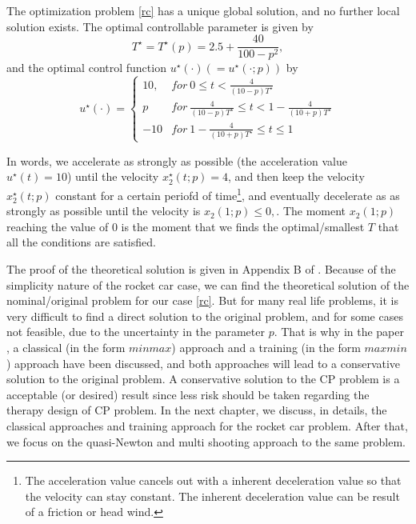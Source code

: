 The optimization problem \ref{rc} has a unique global solution, and no further local solution exists. The optimal controllable parameter is given by 
\begin{equation}
	T^\star = T^\star(p) = 2.5 + \frac{40}{100-p^2},
\end{equation}
and the optimal control function $u^\star(\cdot) (= u^\star(\cdot; p))$ by 
\begin{equation}
	u^\star(\cdot) =     \left\{
	\begin{array}{ll}
		10, & for \  0 \leq t <  \frac{4}{(10-p)T^\star}\\
		p  &  for \ \frac{4}{(10-p)T^\star} \leq t < 1- \frac{4}{(10+p)T^\star} \\
		-10  & for \  1- \frac{4}{(10+p)T^\star} \leq t \leq 1 
	\end{array}
	\right.
\end{equation}

In words, we accelerate as strongly as possible (the acceleration value $u^\star(t)=10$) until the velocity $x^\star_2(t;p)=4$, and then keep the velocity $x^\star_2(t;p)$ constant for a certain periofd of time\footnote{The acceleration value cancels out with a inherent deceleration value so that the velocity can stay constant. The inherent deceleration value can be result of a friction or head wind.}, and eventually decelerate as as strongly as possible until the velocity is $x_2(1;p) \leq 0, \label{rc_x2_t1}$. The moment $x_2(1;p)$ reaching the value of $0$ is the moment that we finds the optimal/smallest $T$ that all the conditions are satisfied. 

The proof of the theoretical solution is given in Appendix B of \cite{MatSch22}. Because of the simplicity nature of the rocket car case, we can find the theoretical solution of the nominal/original problem for our case \ref{rc}. But for many real life problems, it is very difficult to find a direct solution to the original problem, and for some cases not feasible, due to the uncertainty in the parameter $p$. That is why in the paper \cite{MatSch22}, a classical (in the form $minmax$) approach and a training (in the form $maxmin$) approach have been discussed, and both approaches will lead to a conservative solution to the original problem. A conservative solution to the CP problem is a acceptable (or desired) result since less risk should be taken regarding the therapy design of CP problem. In the next chapter, we discuss, in details, the classical approaches and training approach for the rocket car problem. After that, we focus on the quasi-Newton and multi shooting approach to the same problem.  





